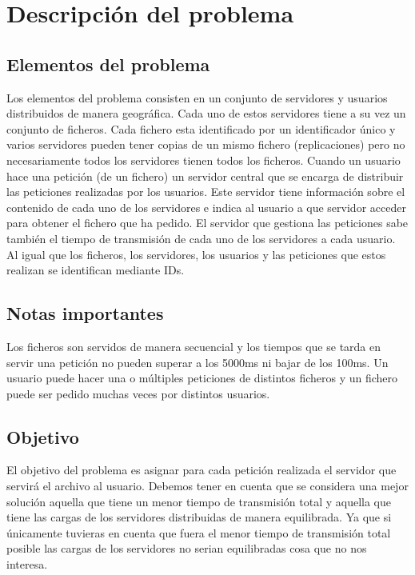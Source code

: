 \section{Descripción del problema}

\subsection{Elementos del problema}

Los elementos del problema consisten en un conjunto de servidores y usuarios distribuidos de manera geográfica. Cada
uno de estos servidores tiene a su vez un conjunto de ficheros. Cada fichero esta identificado por un identificador
único y varios servidores pueden tener copias de un mismo fichero (replicaciones) pero no necesariamente todos
los servidores tienen todos los ficheros. Cuando un usuario hace una petición (de un fichero)
un servidor central que se encarga de distribuir las peticiones realizadas por los usuarios. Este servidor tiene información
sobre el contenido de cada uno de los servidores e indica al usuario a que
servidor acceder para obtener el fichero que ha pedido. El servidor que gestiona las peticiones sabe también el tiempo
de transmisión de cada uno de los servidores a cada usuario. Al igual que los ficheros, los servidores, los usuarios y
las peticiones que estos realizan se identifican mediante IDs.

\subsection{Notas importantes}

Los ficheros son servidos de manera secuencial y los tiempos que se tarda en servir una petición no pueden superar a los 5000ms ni bajar de los 100ms. Un usuario puede hacer una o múltiples peticiones de distintos ficheros y un fichero puede ser pedido muchas veces por distintos usuarios.

\subsection{Objetivo}

El objetivo del problema es asignar para cada petición realizada el servidor que servirá el archivo al usuario.
Debemos tener en cuenta que se considera una mejor solución aquella que tiene un menor tiempo de transmisión total y aquella que tiene las cargas de los servidores distribuidas de manera equilibrada. Ya que si únicamente tuvieras en cuenta que fuera el menor tiempo de transmisión total posible las cargas de los servidores no serian equilibradas cosa que no nos interesa.

